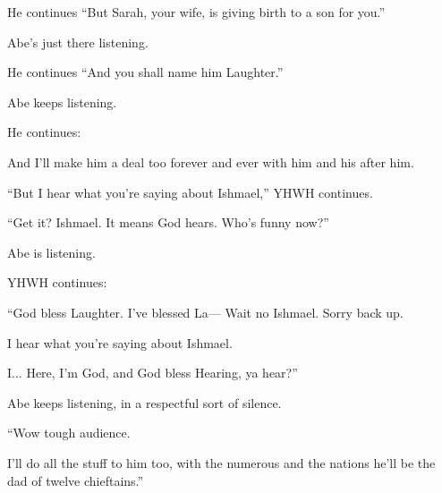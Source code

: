 {
}
{
}
{
	He continues ``But Sarah, your wife, is giving birth to a son for you.''

	Abe's just there listening.

	He continues ``And you shall name him Laughter.''

	Abe keeps listening.

	He continues:
	
	And I'll make him a deal too forever and ever with him and his {\cumb} after him.

}

{
}
{
}
{
	``But I hear what you're saying about Ishmael,'' YHWH continues.

	``Get it? Ishmael. It means God hears. Who's funny now?''

	Abe is listening.

	YHWH continues:

	``God bless Laughter. I've blessed La--- Wait no Ishmael. Sorry back up.

	I hear what you're saying about Ishmael.
	
	I... Here, I'm God, and God bless Hearing, ya hear?''

	Abe keeps listening, in a respectful sort of silence.

	``Wow tough audience.

	I'll do all the stuff to him too, with the numerous and the
	nations he'll be the dad of twelve chieftains.''

}

